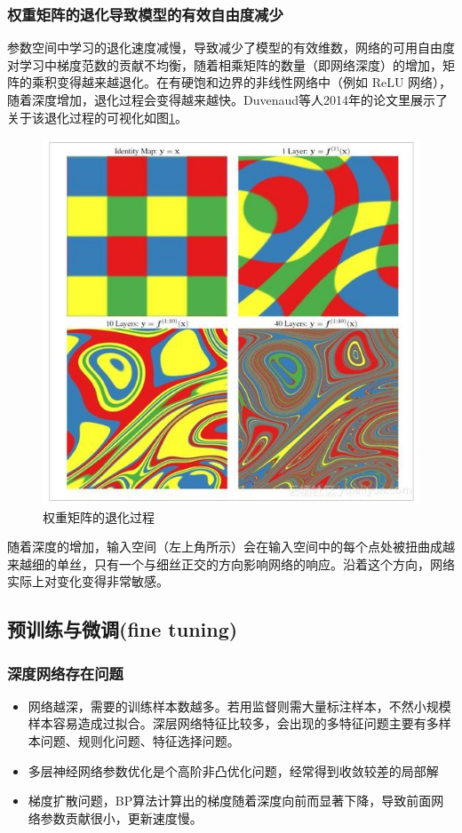 \documentclass[UTF8]{ctexart}
\begin{document}
\subsubsection{权重矩阵的退化导致模型的有效自由度减少}
参数空间中学习的退化速度减慢，导致减少了模型的有效维数，网络的可用自由度对学习中梯度范数的贡献不均衡，随着相乘矩阵的数量（即网络深度）的增加，矩阵的乘积变得越来越退化。在有硬饱和边界的非线性网络中（例如 ReLU 网络），随着深度增加，退化过程会变得越来越快。Duvenaud等人2014年的论文里展示了关于该退化过程的可视化如图\ref{degradation1}。
\begin{figure}[htb]
	\centering
	\includegraphics[width=1.0\textwidth]{figures/degradation1.jpg}
	\caption{权重矩阵的退化过程}
	\label{degradation1}
\end{figure}
\par 随着深度的增加，输入空间（左上角所示）会在输入空间中的每个点处被扭曲成越来越细的单丝，只有一个与细丝正交的方向影响网络的响应。沿着这个方向，网络实际上对变化变得非常敏感。

\subsection{预训练与微调(fine tuning)}
\subsubsection{深度网络存在问题}
\begin{itemize}
	\item 网络越深，需要的训练样本数越多。若用监督则需大量标注样本，不然小规模样本容易造成过拟合。深层网络特征比较多，会出现的多特征问题主要有多样本问题、规则化问题、特征选择问题。
	\item 多层神经网络参数优化是个高阶非凸优化问题，经常得到收敛较差的局部解
	\item 梯度扩散问题，BP算法计算出的梯度随着深度向前而显著下降，导致前面网络参数贡献很小，更新速度慢。
\end{itemize}
\end{document}

